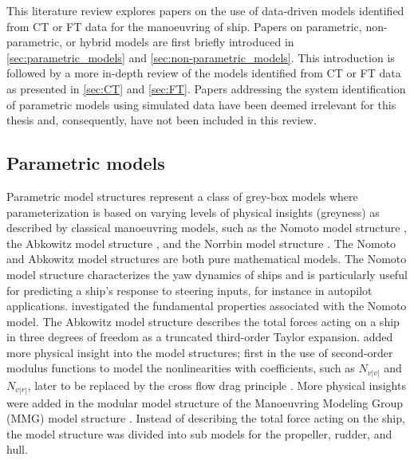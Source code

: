 This literature review explores papers on the use of data-driven models identified from CT or FT data for the manoeuvring of ship. Papers on parametric, non-parametric, or hybrid models are first briefly introduced in \autoref{sec:parametric_models} and \ref{sec:non-parametric_models}. This introduction is followed by a more in-depth review of the models identified from CT or FT data as presented in \autoref{sec:CT} and \ref{sec:FT}.
Papers addressing the system identification of parametric models using simulated data have been deemed irrelevant for this thesis and, consequently, have not been included in this review.

\subsection{Parametric models} \label{sec:parametric_models}
Parametric model structures represent a class of grey-box models where parameterization is based on varying levels of physical insights (greyness) as described by classical manoeuvring models, such as the Nomoto model structure \cite{nomotoSteeringQualitiesShips1957}, the Abkowitz model structure \cite{abkowitzShipHydrodynamicsSteering1964}, and the Norrbin model structure \cite{norrbinTheoryObservationsUse1971}. The Nomoto and Abkowitz model structures are both pure mathematical models. The Nomoto model structure characterizes the yaw dynamics of ships and is particularly useful for predicting a ship's response to steering inputs, for instance in autopilot applications. \textcite{tzengFUNDAMENTALPROPERTIESLINEAR1999} investigated the fundamental properties associated with the Nomoto model. The Abkowitz model structure describes the total forces acting on a ship in three degrees of freedom as a truncated third-order Taylor expansion. \textcite{norrbinTheoryObservationsUse1971} added more physical insight into the model structures; first in the use of second-order modulus functions to model the nonlinearities with coefficients, such as $N_{v|v|}$ and $N_{v|r|}$, later to be replaced by the cross flow drag principle \cite{fossenHandbookMarineCraft2011}. More physical insights were added in the modular model structure of the Manoeuvring Modeling Group (MMG) model structure \cite{ogawaMathematicalModelManoeuvring1978,inouePracticalCalculationMethod1981,yasukawaIntroductionMMGStandard2015}. Instead of describing the total force acting on the ship, the model structure was divided into sub models for the propeller, rudder, and hull.

